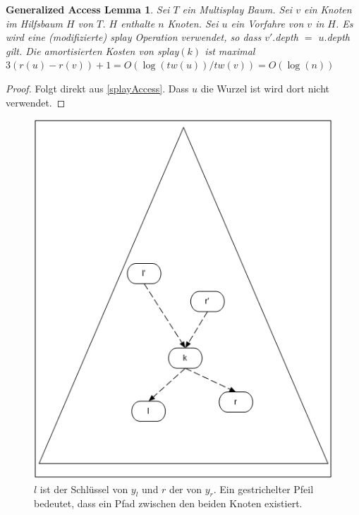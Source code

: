 \documentclass[a4paper,12pt]{article}
\begin{document}
\newtheorem{Lemma1}{Generalized Access Lemma}[section] 
\begin{Lemma1}Sei $T$ ein Multisplay Baum. Sei $v$ ein Knoten im Hilfsbaum $H$ von $T$. $H$ enthalte $n$ Knoten. Sei $u$ ein Vorfahre von $v$ in $H$. Es wird eine (modifizierte) \textit{splay} Operation verwendet, so dass $v'.$\textit{depth} $=$ $u.$\textit{depth} gilt.  Die amortisierten Kosten von \textit{splay}$\left(k\right)$ ist maximal $3 \left(r\left(u\right) - r\left(v\right)\right) + 1 = O\left(\log\left(\mathit{tw}\left(u\right)\right)  / \mathit{tw}\left(v\right) \right) = O\left(\log\left(n\right)\right)$ \\	
\end{Lemma1}
\begin{proof}
Folgt direkt aus \ref{splayAccess}. Dass $u$ die Wurzel ist wird dort nicht verwendet. 	
	
\end{proof}
\begin{figure}[h]
	\centering
	\includegraphics[height= 0.7\textwidth]{"Medien/Multisplay/lemma"}
	\caption {$l$ ist der Schlüssel von $y_l$ und $r$ der von $y_r$. Ein gestrichelter Pfeil bedeutet, dass ein Pfad zwischen den beiden Knoten existiert.}
	\label{fig:lemma}
\end{figure} 
\newtheorem{Lemma2}{Multisplay Baum Access Lemma}[section] \label{lemmaMultiSplay}
\end{document}
